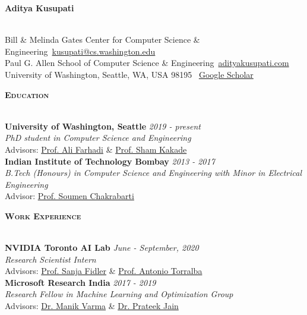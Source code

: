 \documentclass[10pt]{article}
\renewcommand{\section}[1]{
\bigskip
  \begin{Large}
  {\textsc{\textbf{#1}}}
  \end{Large}
  \hrulefill
  \medskip
  \\
}
\providecommand*\email[1]{\href{mailto:#1}{#1}}
\newcommand{\homepage}{https://homes.cs.washington.edu/~kusupati}
\begin{document}
\begin{LARGE}
\textbf{Aditya Kusupati}
\end{LARGE}
\smallskip\\
Bill \& Melinda Gates Center for Computer Science \& Engineering\hfill \faEnvelope~\email{kusupati@cs.washington.edu}\\
Paul G. Allen School of Computer Science \& Engineering\hfill \faHome~\href{\homepage}{adityakusupati.com}\\
University of Washington, Seattle, WA, 
USA 98195 \hfill  \faGraduationCap~\href{https://scholar.google.co.in/citations?user=qULx8g8AAAAJ&hl=en}{Google Scholar}

\section{Education}
\textbf{University of Washington, Seattle} \hfill {\textit{2019 - present}}\\
\emph{PhD student in Computer Science and Engineering}\\%
        Advisors: \href{https://homes.cs.washington.edu/~ali/}{Prof. Ali Farhadi} \& \href{https://homes.cs.washington.edu/~sham/}{Prof. Sham Kakade}\\

\textbf{Indian Institute of Technology Bombay} \hfill {\textit{2013 - 2017}}\\
\emph{B.Tech (Honours) in Computer Science and Engineering with Minor in Electrical Engineering}\\%
        Advisor: \href{http://www.cse.iitb.ac.in/~soumen/}{Prof. Soumen Chakrabarti}
        
\section{Work Experience}
\textbf{NVIDIA Toronto AI Lab} \hfill {\textit{June - September, 2020}}\\
\emph{Research Scientist Intern}\\
        Advisors: \href{http://www.cs.utoronto.ca/~fidler/}{Prof. Sanja Fidler} \& \href{http://web.mit.edu/torralba/www/}{Prof. Antonio Torralba}\\
        
\textbf{Microsoft Research India} \hfill {\textit{2017 - 2019}}\\
\emph{Research Fellow in Machine Learning and Optimization Group}\\
        Advisors: \href{http://manikvarma.org}{Dr. Manik Varma} \& \href{http://prateekjain.org}{Dr. Prateek Jain}
\end{document}
